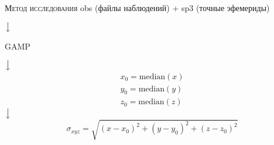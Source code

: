 \begin{frame}{\textsc{Метод исследования}}
\centering
obs (файлы наблюдений) + sp3 (точные эфемериды)

\vspace{1em}
$\big\downarrow$

\vspace{1em}
GAMP

\vspace{1em}
$\big\downarrow$
\begin{equation*}
\begin{aligned}
x_0=\text{median}(x) \\
y_0=\text{median}(y) \\
z_0=\text{median}(z)
\end{aligned}
\end{equation*}
$\big\downarrow$
\begin{equation*}
\sigma_{xyz}=\sqrt{(x-x_0)^2+(y-y_0)^2+(z-z_0)^2}
\end{equation*}
\end{frame}